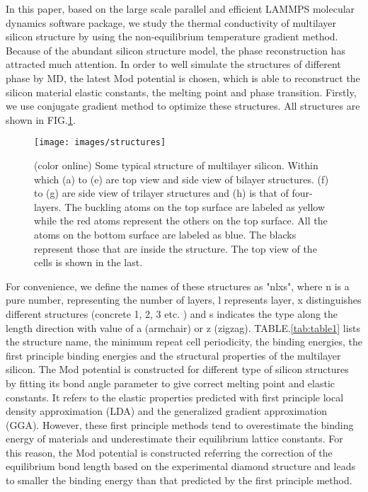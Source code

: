 \documentclass[%
 reprint,
 amsmath,amssymb,
 aps,
 prb,
]{revtex4-1}
\begin{document}
In this paper, based on the large scale parallel and efficient LAMMPS molecular dynamics software package\cite{Parks2007}, we study the thermal conductivity of multilayer silicon structure by using the non-equilibrium temperature gradient method. Because of the abundant silicon structure model, the phase reconstruction has attracted much attention. In order to well simulate the structures of different phase by MD, the latest Mod potential is chosen\cite{Kumagai2007Development}, which is able to reconstruct the silicon material elastic constants, the melting point and phase transition. Firstly, we use conjugate gradient method to optimize these structures. All structures are shown in FIG.\ref{fig:structures}.

\begin{figure}[b]
  \texttt{[image: images/structures]}
  \caption{\label{fig:structures}  (color online) Some typical structure of multilayer silicon. Within which (a) to (e) are top view and side view of bilayer structures. (f) to (g) are side view of trilayer structures and (h) is that of four-layers. The buckling atoms on the top surface are labeled as yellow while the red atoms represent the others on the top surface. All the atoms on the bottom surface are labeled as blue. The blacks represent those that are inside the structure. The top view of the cells is shown in the last.}
\end{figure}

For convenience, we define the names of these structures as "nlxs", where n is a pure number, representing the number of layers, l represents layer, x distinguishes different structures (concrete 1, 2, 3 etc. ) and s indicates the type along the length direction with value of a (armchair) or z (zigzag). TABLE.\ref{tab:table1} lists the structure name, the minimum repeat cell periodicity, the binding energies, the first principle binding energies and the structural properties of the multilayer silicon. The Mod potential is constructed for different type of silicon structures by fitting its bond angle parameter to give correct melting point and elastic constants. It refers to the elastic properties predicted with first principle local density approximation (LDA) and the generalized gradient approximation (GGA). However, these first principle methods tend to overestimate the binding energy of materials and underestimate their equilibrium lattice constants. For this reason, the Mod potential is constructed referring the correction of the equilibrium bond length based on the experimental diamond structure and leads to smaller the binding energy than that predicted by the first principle method.
\end{document}
